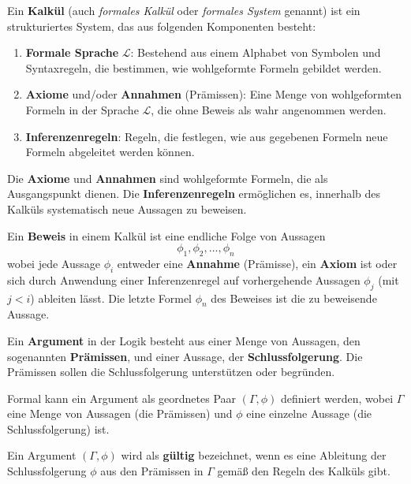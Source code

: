 \documentclass[main.tex]{subfiles}
\begin{document}
\begin{definition}[Kalkül]
Ein \textbf{Kalkül} (auch \textit{formales Kalkül} oder \textit{formales System} genannt) ist ein strukturiertes System, das aus folgenden Komponenten besteht:

\begin{enumerate}
    \item \textbf{Formale Sprache} \(\mathcal{L}\): Bestehend aus einem Alphabet von Symbolen und Syntaxregeln, die bestimmen, wie wohlgeformte Formeln gebildet werden.
    \item \textbf{Axiome} und/oder \textbf{Annahmen} (Prämissen): Eine Menge von wohlgeformten Formeln in der Sprache \(\mathcal{L}\), die ohne Beweis als wahr angenommen werden.
    \item \textbf{Inferenzenregeln}: Regeln, die festlegen, wie aus gegebenen Formeln neue Formeln abgeleitet werden können.
\end{enumerate}

Die \textbf{Axiome} und \textbf{Annahmen} sind wohlgeformte Formeln, die als Ausgangspunkt dienen. Die \textbf{Inferenzenregeln} ermöglichen es, innerhalb des Kalküls systematisch neue Aussagen zu beweisen.
\end{definition}

\begin{definition}[Beweis]
Ein \textbf{Beweis} in einem Kalkül ist eine endliche Folge von Aussagen
\[
\phi_1, \phi_2, \ldots, \phi_n
\]
wobei jede Aussage \(\phi_i\) entweder eine \textbf{Annahme} (Prämisse), ein \textbf{Axiom} ist oder sich durch Anwendung einer Inferenzenregel auf vorhergehende Aussagen \(\phi_{j}\) (mit \(j < i\)) ableiten lässt. Die letzte Formel \(\phi_n\) des Beweises ist die zu beweisende Aussage.
\end{definition}

\begin{definition}[Argument]
Ein \textbf{Argument} in der Logik besteht aus einer Menge von Aussagen, den sogenannten \textbf{Prämissen}, und einer Aussage, der \textbf{Schlussfolgerung}. Die Prämissen sollen die Schlussfolgerung unterstützen oder begründen.

Formal kann ein Argument als geordnetes Paar \((\Gamma, \phi)\)  definiert werden, wobei \(\Gamma\) eine Menge von Aussagen (die Prämissen) und \(\phi\) eine einzelne Aussage (die Schlussfolgerung) ist.

Ein Argument \((\Gamma, \phi)\) wird als \textbf{gültig} bezeichnet, wenn es eine Ableitung der Schlussfolgerung \(\phi\) aus den Prämissen in \(\Gamma\) gemäß den Regeln des Kalküls gibt.

\end{definition}
\end{document}
